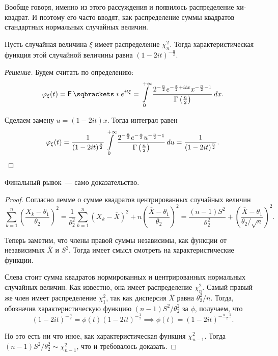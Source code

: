 \begin{remark}
    Вообще говоря, именно из этого рассуждения и появилось распределение хи-квадрат. И 
    поэтому его часто вводят, как распределение суммы квадратов стандартных нормальных 
    случайных величин.
\end{remark}

\begin{lemma}
    Пусть случайная величина \(\xi\) имеет распределение \(\chi^{2}_{n}\). Тогда 
    характеристическая функция этой случайной величины равна \((1 - 2it)^{-\frac{n}{2}}\).
\end{lemma}
\begin{proof}[Решение]
    Будем считать по определению:
    \[
        \phi_{\xi}(t) = \E{e^{it\xi}} = \int\limits_{0}^{+\infty} 
        \frac{2^{-\frac{n}{2}}e^{-\frac{x}{2} + itx}x^{-\frac{n}{2} - 
        1}}{\Gamma\left(\frac{n}{2}\right)}\diff x.
    \]
    
    Сделаем замену \(u = (1 - 2it)x\). Тогда интеграл равен
    \[
        \varphi_{\xi}(t) = \frac{1}{(1 - 2it)^{\frac{n}{2}}}\int\limits_{0}^{+\infty} 
        \frac{2^{-\frac{n}{2}}e^{-\frac{u}{2}}u^{-\frac{n}{2} - 
        1}}{\Gamma\left(\frac{n}{2}\right)}\mathop{}\!d u = \frac{1}{(1 - 2it)^{\frac{n}{2}}}. 
        \qedhere
    \]
\end{proof}

Финальный рывок~--- само доказательство.
\begin{proof}
    Согласно лемме о сумме квадратов центрированных случайных величин
    \[
        \sum_{k = 1}^{n} \left(\frac{X_{k} - \theta_{1}}{\theta_{2}}\right)^{2} = 
        \frac{1}{\theta_{2}^{2}}\sum_{k = 1}^{n} (X_{k} - \overline{X})^{2} 
        + n\left(\frac{\overline{X} - \theta_{1}}{\theta_{2}}\right)^{2} = \frac{(n - 
        1)S^{2}}{\theta_{2}^{2}} + \left(\frac{\overline{X} - 
        \theta_{1}}{\theta_{2}/\sqrt{n}}\right)^{2}.
    \]
    
    Теперь заметим, что члены правой суммы независимы, как функции от независимых 
    \(\overline{X}\) и \(S^{2}\). Тогда имеет смысл смотреть на характеристические 
    функции.
    
    Слева стоит сумма квадратов нормированных и центрированных нормальных случайных 
    величин. Как известно, она имеет распределение \(\chi^{2}_{n}\). Самый правый же член 
    имеет распределение \(\chi^{2}_{1}\), так как дисперсия \(\overline{X}\) равна 
    \(\theta_{2}^{2}/n\). Тогда, обозначив характеристическую функцию \((n - 
    1)S^{2}/\theta_{2}^{2}\) за \(\phi\), получаем, что
    \[
        (1 - 2it)^{-\frac{n}{2}} = \phi(t)(1 - 2it)^{-\frac{1}{2}} \implies \phi(t) = (1 
        - 2it)^{-\frac{n - 1}{2}}.
    \]
    
    Но это есть ни что иное, как характеристическая функция \(\chi^{2}_{n - 1}\). Тогда 
    \((n - 1)S^{2}/\theta_{2}^{2} \sim \chi^{2}_{n - 1}\), что и требовалось доказать.
\end{proof}

